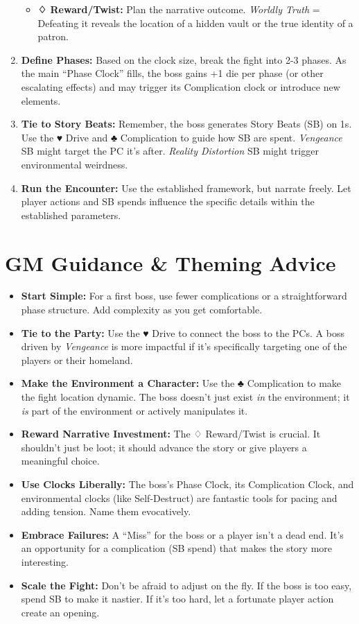 \begin{enumerate}
\begin{itemize}
        \item \textbf{♢ Reward/Twist:} Plan the narrative outcome. \emph{Worldly Truth} = Defeating it reveals the location of a hidden vault or the true identity of a patron.
    \end{itemize}
    \item \textbf{Define Phases:} Based on the clock size, break the fight into 2-3 phases. As the main ``Phase Clock'' fills, the boss gains +1 die per phase (or other escalating effects) and may trigger its Complication clock or introduce new elements.
    \item \textbf{Tie to Story Beats:} Remember, the boss generates Story Beats (SB) on 1s. Use the ♥ Drive and ♣ Complication to guide how SB are spent. \emph{Vengeance} SB might target the PC it's after. \emph{Reality Distortion} SB might trigger environmental weirdness.
    \item \textbf{Run the Encounter:} Use the established framework, but narrate freely. Let player actions and SB spends influence the specific details within the established parameters.
\end{enumerate}

\section{GM Guidance \& Theming Advice}

\begin{itemize}
    \item \textbf{Start Simple:} For a first boss, use fewer complications or a straightforward phase structure. Add complexity as you get comfortable.
    \item \textbf{Tie to the Party:} Use the ♥ Drive to connect the boss to the PCs. A boss driven by \emph{Vengeance} is more impactful if it's specifically targeting one of the players or their homeland.
    \item \textbf{Make the Environment a Character:} Use the ♣ Complication to make the fight location dynamic. The boss doesn't just exist \emph{in} the environment; it \emph{is} part of the environment or actively manipulates it.
    \item \textbf{Reward Narrative Investment:} The ♢ Reward/Twist is crucial. It shouldn't just be loot; it should advance the story or give players a meaningful choice.
    \item \textbf{Use Clocks Liberally:} The boss's Phase Clock, its Complication Clock, and environmental clocks (like Self-Destruct) are fantastic tools for pacing and adding tension. Name them evocatively.
    \item \textbf{Embrace Failures:} A ``Miss'' for the boss or a player isn't a dead end. It's an opportunity for a complication (SB spend) that makes the story more interesting.
    \item \textbf{Scale the Fight:} Don't be afraid to adjust on the fly. If the boss is too easy, spend SB to make it nastier. If it's too hard, let a fortunate player action create an opening.
\end{itemize}


